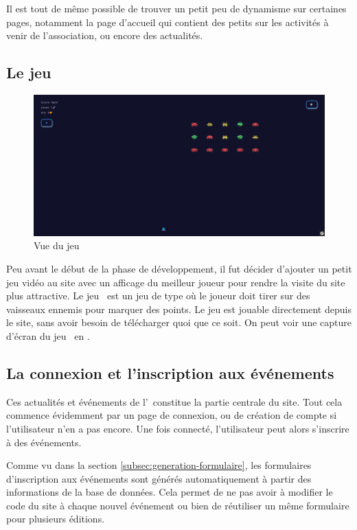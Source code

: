 Il est tout de même possible de trouver un petit peu de dynamisme sur certaines pages, notamment la page d'accueil qui contient des petits  sur les activités à venir de l'association, ou encore des actualités.

\subsection{Le jeu \game}
\label{subsec:jeu}

\begin{figure}[h]
    \centering
    \includegraphics[width=\textwidth]{assets/pictures/game.png}
    \caption{Vue du jeu \game}
    \label{fig:game}
\end{figure}

Peu avant le début de la phase de développement, il fut décider d'ajouter un petit jeu vidéo au site avec un afficage du meilleur joueur pour rendre la visite du site plus attractive. Le jeu \game\ est un jeu de type  où le joueur doit tirer sur des vaisseaux ennemis pour marquer des points. Le jeu est jouable directement depuis le site, sans avoir besoin de télécharger quoi que ce soit. On peut voir une capture d'écran du jeu \game\ en .

\subsection{La connexion et l'inscription aux événements}
\label{subsec:connexion-inscription}

Ces actualités et événements de l'\ofni\ constitue la partie centrale du site. Tout cela commence évidemment par un page de connexion, ou de création de compte si l'utilisateur n'en a pas encore. Une fois connecté, l'utilisateur peut alors s'inscrire à des événements.

Comme vu dans la section \ref{subsec:generation-formulaire}, les formulaires d'inscription aux événements sont générés automatiquement à partir des informations de la base de données. Cela permet de ne pas avoir à modifier le code du site à chaque nouvel événement ou bien de réutiliser un même formulaire pour plusieurs éditions.
\bigskip

